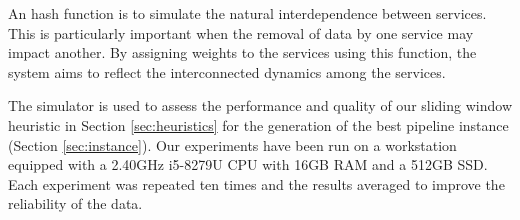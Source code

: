 An hash function is to simulate the natural interdependence between services.
This is particularly important when the removal of data by one service may impact another.
By assigning weights to the services using this function, the system aims to reflect the interconnected dynamics among the services.

The simulator is used to assess the performance and quality of our sliding window heuristic in Section \ref{sec:heuristics} for the generation of the best pipeline instance (Section \ref{sec:instance}).
Our experiments have been run on a workstation equipped with a 2.40GHz i5-8279U CPU with 16GB RAM and a 512GB SSD.
Each experiment was repeated ten times and the results averaged to improve the reliability of the data.



